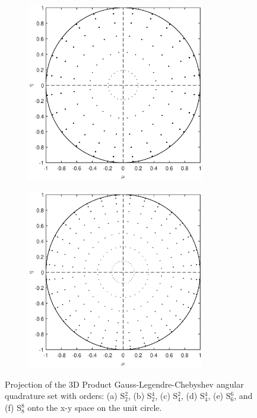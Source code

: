 \begin{figure}
\begin{subfigure}[b]{0.46\textwidth}
	\end{subfigure}
	\vfill
	\begin{subfigure}[b]{0.46\textwidth}
		\centering
		\includegraphics[width=0.85\textwidth]{figures/sec_Sn/PGLC6_6_2D.eps}
		\caption{}
	\end{subfigure}
	\hfill
	\begin{subfigure}[b]{0.46\textwidth}
		\centering
		\includegraphics[width=0.85\textwidth]{figures/sec_Sn/PGLC8_8_2D.eps}
		\caption{}
	\end{subfigure}
\caption[2D Product Gauss-Legendre-Chebyshev angular quadrature set]{Projection of the 3D Product Gauss-Legendre-Chebyshev angular quadrature set with orders: (a) S$_2^2$, (b) S$_2^4$, (c) S$_4^2$, (d) S$_4^4$, (e) S$_6^6$, and (f) S$_8^8$ onto the x-y space on the unit circle.}
\label{fig::Sn_Angle_PGLC_Quads_2D}
\end{figure}

